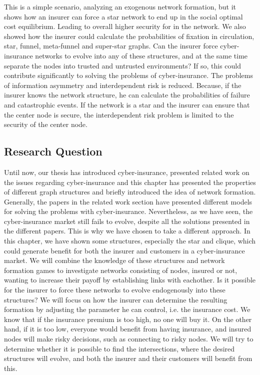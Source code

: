 This is a simple scenario, analyzing an exogenous network formation, but it shows how an insurer can force a star network to end up in the social optimal cost equilibrium. Leading to overall higher security for in the network. We also showed how the insurer could calculate the probabilities of fixation in circulation, star, funnel, meta-funnel and super-star graphs.  Can the insurer force cyber-insurance networks to evolve into any of these structures, and at the same time separate the nodes into trusted and untrusted environments? 
If so, this could contribute significantly to solving the problems of cyber-insurance. The problems of information asymmetry and interdependent risk is reduced. Because, if the insurer knows the network structure, he can calculate the probabilities of failure and catastrophic events. If the network is a star and the insurer can ensure that the center node is secure, the interdependent risk problem is limited to the security of the center node.



\subsection{Research Question}

Until now, our thesis has introduced cyber-insurance, presented related work on the issues regarding cyber-insurance and this chapter has presented the properties of different graph structures and briefly introduced the idea of network formation. Generally, the papers in the related work section have presented different models for solving the problems with cyber-insurance. Nevertheless, as we have seen, the cyber-insurance market still fails to evolve, despite all the solutions presented in the different papers. This is why we have chosen to take a different approach.
In this chapter, we have shown some structures, especially the star and clique, which could generate benefit for both the insurer and customers in a cyber-insurance market. 
We will combine the knowledge of these structures and network formation games to investigate networks consisting of nodes, insured or not, wanting to increase their payoff by establishing links with eachother. Is it possible for the insurer to force these networks to evolve endogenously into these structures?
We will focus on how the insurer can determine the resulting formation by adjusting the parameter he can control, i.e. the insurance cost. We know that if the insurance premium is too high, no one will buy it. On the other hand, if it is too low, everyone would benefit from having insurance, and insured nodes will make risky decisions, such as connecting to risky nodes. We will try to determine whether it is possible to find the intersections, where the desired structures will evolve, and both the insurer and their customers will benefit from this.
